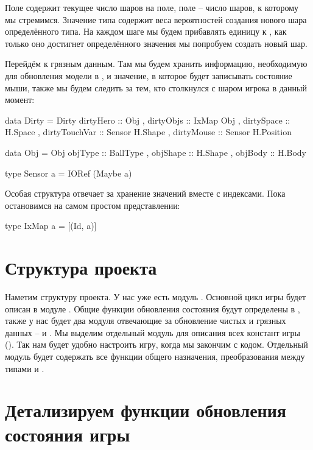 Поле  содержит текущее число шаров на поле,
поле  -- число шаров, к которому мы стремимся.
Значение типа  содержит веса вероятностей создания
нового шара определённого типа. На каждом шаге мы будем 
прибавлять единицу к , как только оно достигнет
определённого значения мы попробуем создать новый шар.

Перейдём к грязным данным. Там мы будем хранить информацию,
необходимую для обновления модели в ,
и значение, в которое  будет записывать
состояние мыши, также мы будем следить за тем, кто
столкнулся с шаром игрока в данный момент:

\begin{code}
data Dirty = Dirty 
    { dirtyHero     :: Obj
    , dirtyObjs     :: IxMap Obj
    , dirtySpace    :: H.Space
    , dirtyTouchVar :: Sensor H.Shape
    , dirtyMouse    :: Sensor H.Position
    }

data Obj = Obj 
    { objType     :: BallType
    , objShape    :: H.Shape
    , objBody     :: H.Body
    } 

type Sensor a = IORef (Maybe a)
\end{code}

Особая структура  отвечает за хранение
значений вместе с индексами. Пока остановимся на самом 
простом представлении:

\begin{code}
type IxMap a = [(Id, a)]
\end{code}

\section{Структура проекта}

Наметим структуру проекта. У нас уже есть модуль .
Основной цикл игры будет описан в модуле . 
Общие функции обновления состояния будут определены в
, также у нас будет два модуля отвечающие
за обновление чистых и грязных данных --  и
. Мы выделим отдельный модуль для описания
всех констант игры (). Так нам будет удобно настроить
игру, когда мы закончим с кодом. Отдельный модуль
 будет содержать все функции общего назначения,
преобразования между типами  и .

\section{Детализируем функции обновления состояния игры}

